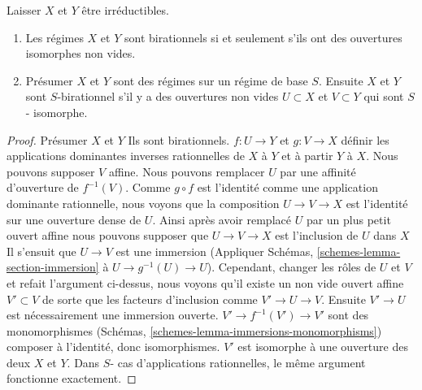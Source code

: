 \begin{lemma}

\label{lemma-birational-integral}

Laisser $X$ et $Y$ être irréductibles.

\begin{enumerate}

\item Les régimes $X$ et $Y$ sont birationnels si et seulement s'ils ont des ouvertures isomorphes non vides.
\item Présumer $X$ et $Y$ sont des régimes sur un régime de base $S$. Ensuite
$X$ et $Y$ sont $S$-birationnel s'il y a des ouvertures non vides $U \subset X$ et $V \subset Y$ qui sont $S$- isomorphe.

\end{enumerate}

\end{lemma}

\begin{proof}

Présumer $X$ et $Y$ Ils sont birationnels. $f : U \to Y$ et $g : V \to X$
définir les applications dominantes inverses rationnelles de $X$ à $Y$ et à partir $Y$ à $X$. Nous pouvons supposer $V$ affine. Nous pouvons remplacer $U$ par une affinité d'ouverture de $f^{-1}(V)$. Comme $g \circ f$ est l'identité comme une application dominante rationnelle, nous voyons que la composition $U \to V \to X$ est l'identité sur une ouverture dense de $U$. Ainsi après avoir remplacé $U$ par un plus petit ouvert affine nous pouvons supposer que
$U \to V \to X$ est l'inclusion de $U$ dans $X$Il s'ensuit que
$U \to V$ est une immersion (Appliquer Schémas, \ref{schemes-lemma-section-immersion}
à $U \to g^{-1}(U) \to U$). Cependant, changer les rôles de $U$ et $V$ et refait l'argument ci-dessus, nous voyons qu'il existe un non vide ouvert affine $V' \subset V$
de sorte que les facteurs d'inclusion comme $V' \to U \to V$. Ensuite $V' \to U$ est nécessairement une immersion ouverte. $V' \to f^{-1}(V') \to V'$ sont des monomorphismes (Schémas, \ref{schemes-lemma-immersions-monomorphisms}) composer à l'identité, donc isomorphismes. $V'$ est isomorphe à une ouverture des deux $X$ et $Y$. Dans $S$- cas d'applications rationnelles, le même argument fonctionne exactement.

\end{proof}

